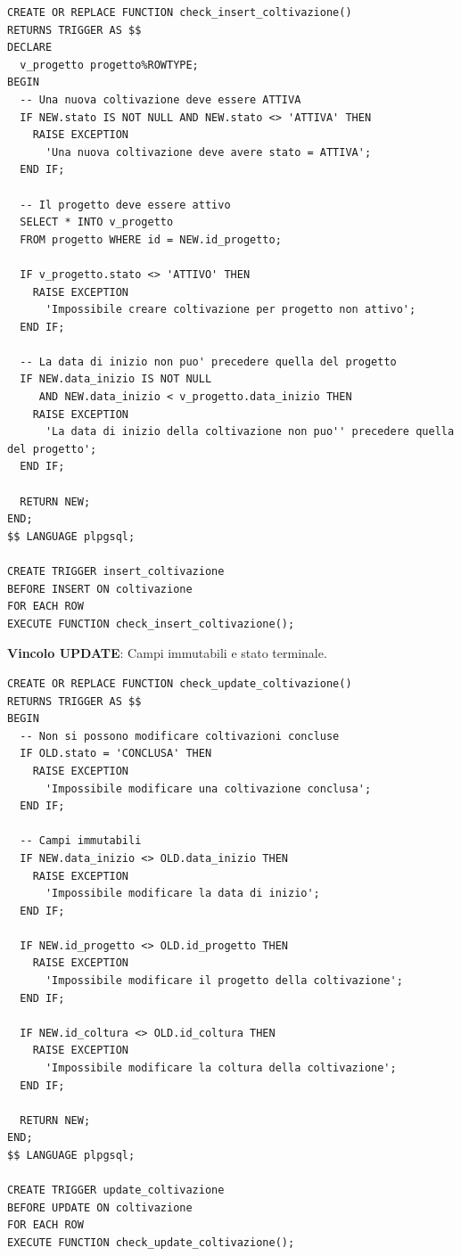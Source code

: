 \documentclass[12pt,a4paper]{article}
\begin{document}
\begin{lstlisting}[style=sqlstyle]
CREATE OR REPLACE FUNCTION check_insert_coltivazione()
RETURNS TRIGGER AS $$
DECLARE
  v_progetto progetto%ROWTYPE;
BEGIN
  -- Una nuova coltivazione deve essere ATTIVA
  IF NEW.stato IS NOT NULL AND NEW.stato <> 'ATTIVA' THEN
    RAISE EXCEPTION 
      'Una nuova coltivazione deve avere stato = ATTIVA';
  END IF;

  -- Il progetto deve essere attivo
  SELECT * INTO v_progetto
  FROM progetto WHERE id = NEW.id_progetto;

  IF v_progetto.stato <> 'ATTIVO' THEN 
    RAISE EXCEPTION 
      'Impossibile creare coltivazione per progetto non attivo';
  END IF;

  -- La data di inizio non puo' precedere quella del progetto
  IF NEW.data_inizio IS NOT NULL 
     AND NEW.data_inizio < v_progetto.data_inizio THEN 
    RAISE EXCEPTION 
      'La data di inizio della coltivazione non puo'' precedere quella del progetto';
  END IF;

  RETURN NEW;
END;
$$ LANGUAGE plpgsql;

CREATE TRIGGER insert_coltivazione
BEFORE INSERT ON coltivazione
FOR EACH ROW
EXECUTE FUNCTION check_insert_coltivazione();
\end{lstlisting}

\textbf{Vincolo UPDATE}: Campi immutabili e stato terminale.

\begin{lstlisting}[style=sqlstyle]
CREATE OR REPLACE FUNCTION check_update_coltivazione()
RETURNS TRIGGER AS $$
BEGIN
  -- Non si possono modificare coltivazioni concluse
  IF OLD.stato = 'CONCLUSA' THEN 
    RAISE EXCEPTION 
      'Impossibile modificare una coltivazione conclusa';
  END IF;

  -- Campi immutabili
  IF NEW.data_inizio <> OLD.data_inizio THEN 
    RAISE EXCEPTION 
      'Impossibile modificare la data di inizio';
  END IF;

  IF NEW.id_progetto <> OLD.id_progetto THEN 
    RAISE EXCEPTION 
      'Impossibile modificare il progetto della coltivazione';
  END IF;

  IF NEW.id_coltura <> OLD.id_coltura THEN 
    RAISE EXCEPTION 
      'Impossibile modificare la coltura della coltivazione';
  END IF;

  RETURN NEW;
END;
$$ LANGUAGE plpgsql;

CREATE TRIGGER update_coltivazione
BEFORE UPDATE ON coltivazione
FOR EACH ROW
EXECUTE FUNCTION check_update_coltivazione();
\end{lstlisting}
\end{document}
